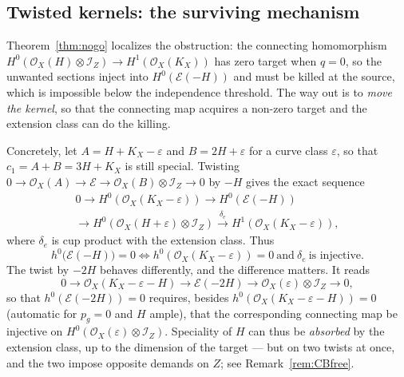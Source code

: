 \documentclass[10pt,a4paper]{amsart}
\newcommand{\OO}{\mathcal{O}}
\newcommand{\EE}{\mathcal{E}}
\newcommand{\II}{\mathcal{I}}
\begin{document}
\subsection{Twisted kernels: the surviving mechanism}\label{subsec:twisted}
Theorem~\ref{thm:nogo} localizes the obstruction: the connecting homomorphism $H^0(\OO_X(H)\otimes\II_Z)\to H^1(\OO_X(K_X))$ has zero target when $q=0$, so the unwanted sections inject into $H^0(\EE(-H))$ and must be killed at the source, which is impossible below the independence threshold. The way out is to \emph{move the kernel}, so that the connecting map acquires a non-zero target and the extension class can do the killing.

Concretely, let $A=H+K_X-\varepsilon$ and $B=2H+\varepsilon$ for a curve class $\varepsilon$, so that $c_1=A+B=3H+K_X$ is still special. Twisting $0\to\OO_X(A)\to\EE\to\OO_X(B)\otimes\II_Z\to0$ by $-H$ gives the exact sequence
\begin{multline*}
0\to H^0(\OO_X(K_X-\varepsilon))\to H^0(\EE(-H))\\
\to H^0(\OO_X(H+\varepsilon)\otimes\II_Z)
\xrightarrow{\ \delta_e\ } H^1(\OO_X(K_X-\varepsilon)),
\end{multline*}
where $\delta_e$ is cup product with the extension class. Thus
\[
h^0\bigl(\EE(-H)\bigr)=0
\iff
h^0(\OO_X(K_X-\varepsilon))=0\ \text{and}\ \delta_e\ \text{is injective}.
\]
The twist by $-2H$ behaves differently, and the difference matters. It reads
\[
0\to\OO_X(K_X-\varepsilon-H)\to\EE(-2H)\to\OO_X(\varepsilon)\otimes\II_Z\to0 ,
\]
so that $h^0(\EE(-2H))=0$ requires, besides $h^0(\OO_X(K_X-\varepsilon-H))=0$ (automatic for $p_g=0$ and $H$ ample), that the corresponding connecting map be injective on $H^0(\OO_X(\varepsilon)\otimes\II_Z)$. Speciality of $H$ can thus be \emph{absorbed} by the extension class, up to the dimension of the target --- but on two twists at once, and the two impose opposite demands on $Z$; see Remark~\ref{rem:CBfree}.
\end{document}
